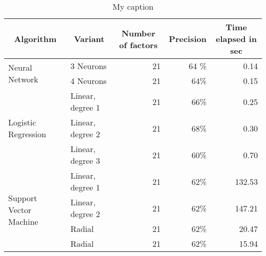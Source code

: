 \documentclass[10pt,letterpaper,oneside]{article}
\begin{document}
\begin{table}[]
	\centering
	\caption{My caption}
	\label{my-label}
	\begin{tabular}{llrrr}
		\hline
		\multicolumn{1}{c}{\textbf{Algorithm}}  & \multicolumn{1}{c}{\textbf{Variant}} & \multicolumn{1}{c}{\textbf{Number of factors}} & \multicolumn{1}{c}{\textbf{Precision}} & \multicolumn{1}{c}{\textbf{Time elapsed in sec}} \\ \hline
		\multirow{2}{*}{Neural Network}         & 3 Neurons                            & 21                                             & 64 \%                                  & 0.14                                             \\
		& 4 Neurons                            & 21                                             & 64\%                                  & 0.15                                             \\
		\multirow{3}{*}{Logistic Regression}    & Linear, degree 1                     & 21                                             & 66\%                                   & 0.25                                             \\
		& Linear, degree 2                     & 21                                             & 68\%                                   & 0.30                                             \\
		& Linear, degree 3                     & 21                                             & 60\%                                   & 0.70                                             \\
		\multirow{4}{*}{Support Vector Machine} & Linear, degree 1                     & 21                                             & 62\%                                   & 132.53                                           \\
		& Linear, degree 2                     & 21                                             & 62\%                                   & 147.21                                           \\
		& Radial                               & 21                                             & 62\%                                   & 20.47                                            \\
		& Radial                               & 21                                             & 62\%                                   & 15.94                                           
	\end{tabular}
\end{table}
\end{document}

